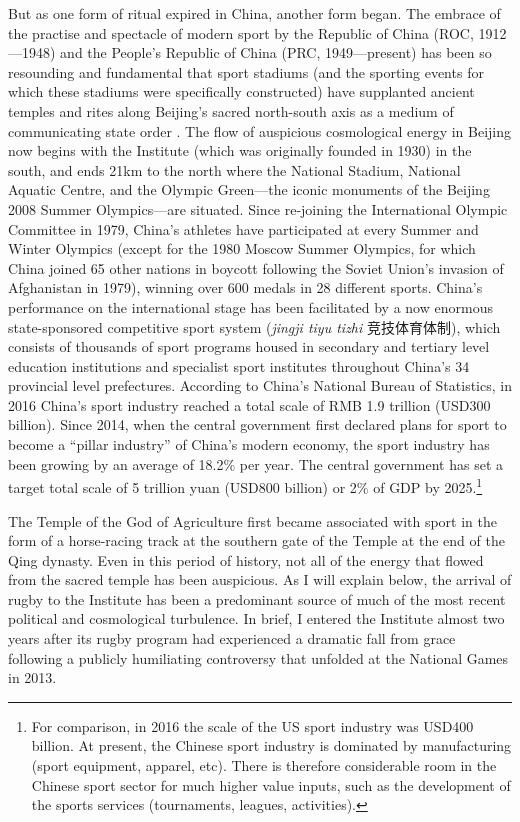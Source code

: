 \begin{CJK}{UTF8}{gbsn}
But as one form of ritual expired in China, another form began.
The embrace of the practise and spectacle of modern sport by the Republic of China (ROC, 1912---1948) and the People's Republic of China (PRC, 1949---present) has been so resounding and fundamental that sport stadiums (and the sporting events for which these stadiums were specifically constructed) have supplanted ancient temples and rites along Beijing's sacred north-south axis as a medium of communicating state order \citep{Brownell1995}.  The flow of auspicious cosmological energy in Beijing now begins with the Institute (which was originally founded in 1930) in the south, and ends 21km to the north where the National Stadium, National Aquatic Centre, and the Olympic Green---the iconic monuments of the Beijing 2008 Summer Olympics---are situated.  Since re-joining the International Olympic Committee in 1979, China's athletes have participated at every Summer and Winter Olympics (except for the 1980 Moscow Summer Olympics, for which China joined 65 other nations in boycott following the Soviet Union's invasion of Afghanistan in 1979), winning over 600 medals in 28 different sports.  China's performance on the international stage has been facilitated by a now enormous state-sponsored competitive sport system (\textit{jingji tiyu tizhi} 竞技体育体制), which consists of thousands of sport programs housed in secondary and tertiary level education institutions and specialist sport institutes throughout China's 34 provincial level prefectures.  According to China's National Bureau of Statistics, in 2016 China's sport industry reached a total scale of RMB 1.9 trillion (USD300 billion).  Since 2014, when the central government first declared plans for sport to become a ``pillar industry'' of China's modern economy, the sport industry has been growing by an average of 18.2\% per year.  The central government has set a target total scale of 5 trillion yuan (USD800 billion) or 2\% of GDP by 2025.\footnote{For comparison, in 2016 the scale of the US sport industry was USD400 billion. At present, the Chinese sport industry is dominated by manufacturing (sport equipment, apparel, etc).  There is therefore considerable room in the Chinese sport sector for much higher value inputs, such as the development of the sports services (tournaments, leagues, activities).}

The Temple of the God of Agriculture first became associated with sport in the form of a horse-racing track at the southern gate of the Temple at the end of the Qing dynasty.  Even in this period of history, not all of the energy that flowed from the sacred temple has been auspicious.  As I will explain below, the arrival of rugby to the Institute has been a predominant source of much of the most recent political and cosmological turbulence.  In brief, I entered the Institute almost two years after its rugby program had experienced a dramatic fall from grace following a publicly humiliating controversy that unfolded at the National Games in 2013.


\end{CJK}
